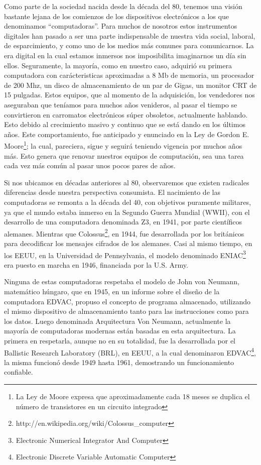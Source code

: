 \documentclass[%
 	final,
%
	notitlepage,
	narroweqnarray,
	inline,
 	twoside,
	]{ieee}
\newcommand{\link}[1]{\textit{}{#1}}
\begin{document}
Como parte de la sociedad nacida desde la d\'ecada del 80, tenemos una visi\'on bastante lejana de los comienzos de los dispositivos electr\'onicos a los que denominamos ``computadoras''. Para muchos de nosotros estos instrumentos digitales han pasado a ser una parte indispensable de nuestra vida social, laboral, de esparcimiento, y como uno de los medios m\'as comunes para comunicarnos. La era digital en la cual estamos inmersos nos imposibilita imaginarnos un d\'ia sin ellos. 
Seguramente, la mayor\'ia, como en nuestro caso, adquiri\'o su primera computadora con car\'acteristicas aproximadas a 8 Mb de memoria, un procesador de 200 Mhz, un disco de almacenamiento de un par de Gigas, un monitor CRT de 15 pulgadas. Estos equipos, que al momento de la adquisici\'on, los vendedores nos aseguraban que ten\'iamos para muchos a\~nos venideros, al pasar el tiempo se convirtieron en carromatos electr\'onicos s\'uper obsoletos, actualmente hablando. Esto debido al crecimiento masivo y continuo que se est\'a dando en los \'ultimos a\~nos.
Este comportamiento, fue anticipado y enunciado en la Ley de Gordon E. Moore\footnote{La Ley de Moore expresa que aproximadamente cada 18 meses se duplica el n\'umero de transistores en un circuito integrado\cite{LeyMoore}}; la cual, pareciera, sigue y seguir\'a teniendo vigencia por muchos a\~nos m\'as. Esto genera que renovar nuestros equipos de computaci\'on, sea una tarea cada vez m\'as com\'un al pasar unos pocos pares de a\~nos.

Si nos ubicamos en d\'ecadas anteriores al 80, observaremos que existen radicales diferencias desde nuestra perspectiva consumista.
El nacimiento de las computadoras se remonta a la d\'ecada del 40, con objetivos puramente militares, ya que el mundo estaba inmerso en la Segundo Guerra Mundial (WWII), con el desarrollo de una computadora denominada Z3\cite{z3}, en 1941, por parte cient\'ificos alemanes. Mientras que Colossus\footnote{\link{http://en.wikipedia.org/wiki/Colossus\_computer}}, en 1944, fue desarrollada por los brit\'anicos para decodificar los mensajes cifrados de los alemanes. Casi al mismo tiempo, en los EEUU, en la Universidad de Pennsylvania, el modelo denominado ENIAC\footnote{Electronic Numerical Integrator And Computer\cite{eniac}} era puesto en marcha en 1946, financiada por la U.S. Army.

Ninguna de estas computadoras respetaba el modelo de John von Neumann, matem\'atico h\'ungaro, que en 1945, en un informe sobre el dise\~no de la computadora EDVAC, propuso el concepto de programa almacenado, utilizando el mismo dispositivo de almacenamiento tanto para las instrucciones como para los datos. Luego denominada Arquitectura Von Neumann\cite{newman}, actualmente la mayor\'ia de computadoras modernas est\'an basadas en esta arquitectura.
La primera en respetarla, aunque no en su totalidad, fue la desarrollada por el Ballistic Research Laboratory (BRL), en EEUU, a la cual denominaron EDVAC\footnote{Electronic Discrete Variable Automatic Computer\cite{edvac}}, la misma funcion\'o desde 1949 hasta 1961, demostrando un funcionamiento confiable.
\end{document}
